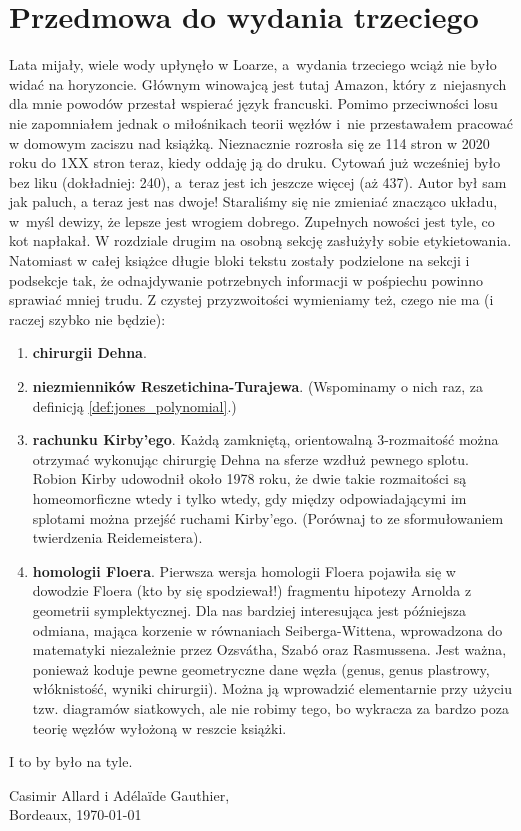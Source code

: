 \section*{Przedmowa do wydania trzeciego}
Lata mijały, wiele wody upłynęło w Loarze, a~wydania trzeciego wciąż nie było widać na horyzoncie.
Głównym winowajcą jest tutaj Amazon, który z~niejasnych dla mnie powodów przestał wspierać język francuski.
Pomimo przeciwności losu nie zapomniałem jednak o miłośnikach teorii węzłów i~nie przestawałem pracować w domowym zaciszu nad książką.
Nieznacznie rozrosła się ze 114 stron w 2020 roku do 1XX stron teraz, kiedy oddaję ją do druku.
Cytowań już wcześniej było bez liku (dokładniej: 240), a~teraz jest ich jeszcze więcej (aż 437).
Autor był sam jak paluch, a teraz jest nas dwoje!
Staraliśmy się nie zmieniać znacząco układu, w~myśl dewizy, że lepsze jest wrogiem dobrego.
Zupełnych nowości jest tyle, co kot napłakał.
W rozdziale drugim na osobną sekcję zasłużyły sobie etykietowania.
Natomiast w całej książce długie bloki tekstu zostały podzielone na sekcji i podsekcje tak, że odnajdywanie potrzebnych informacji w pośpiechu powinno sprawiać mniej trudu.
Z czystej przyzwoitości wymieniamy też, czego nie ma (i raczej szybko nie będzie):
\begin{enumerate}
    \item \textbf{chirurgii Dehna}.
    \item \textbf{niezmienników Reszetichina-Turajewa}.
    (Wspominamy o nich raz, za definicją \ref{def:jones_polynomial}.)
    \item \textbf{rachunku Kirby'ego}.
    Każdą zamkniętą, orientowalną 3-rozmaitość można otrzymać wykonując chirurgię Dehna na sferze wzdłuż pewnego splotu. Robion Kirby udowodnił około 1978 roku, że dwie takie rozmaitości są homeomorficzne wtedy i tylko wtedy, gdy między odpowiadającymi im splotami można przejść ruchami Kirby'ego.
    (Porównaj to ze sformułowaniem twierdzenia Reidemeistera).
    \item \textbf{homologii Floera}.
    Pierwsza wersja homologii Floera pojawiła się w dowodzie Floera (kto by się spodziewał!) fragmentu hipotezy Arnolda z geometrii symplektycznej.
    Dla nas bardziej interesująca jest późniejsza odmiana, mająca korzenie w równaniach Seiberga-Wittena, wprowadzona do matematyki niezależnie przez Ozsvátha, Szabó oraz Rasmussena.
    Jest ważna, ponieważ koduje pewne geometryczne dane węzła (genus, genus plastrowy, włóknistość, wyniki chirurgii).
    Można ją wprowadzić elementarnie przy użyciu tzw. diagramów siatkowych, ale nie robimy tego, bo wykracza za bardzo poza teorię węzłów wyłożoną w reszcie książki.
\end{enumerate}
I to by było na tyle.
\begin{flushright}
    Casimir Allard i Adélaïde Gauthier,\\Bordeaux, \today
\end{flushright}

